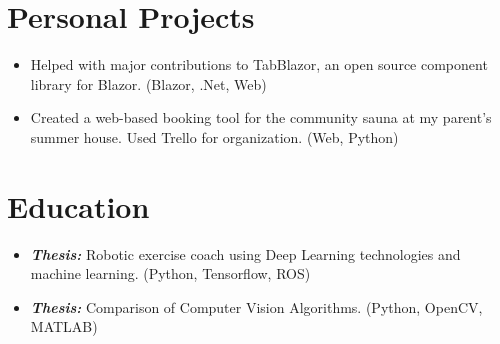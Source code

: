 \documentclass[11pt,a4paper,sans,colorlinks,linkcolor=blue,urlcolor=blue]{moderncv}
\begin{document}
\section{Personal Projects}
{\begin{itemize}
    \itemsep0.3em
    \setlength{\itemindent}{.25in}
    \item Helped with major contributions to TabBlazor, an open source component library for Blazor. (Blazor, .Net, Web)
\end{itemize}}

{\begin{itemize}
    \itemsep0.3em
    \setlength{\itemindent}{.25in}
    \item Created a web-based booking tool for the community sauna at my parent's summer house. Used Trello for organization. (Web, Python)
\end{itemize}}

\section{Education}
{\begin{itemize}
    \setlength{\itemindent}{.25in}
    \itemsep0.3em
    \item \textit{\textbf{Thesis:}} Robotic exercise coach using Deep Learning technologies and machine learning. (Python, Tensorflow, ROS)
\end{itemize}}



{\begin{itemize}
    \setlength{\itemindent}{.25in}
    \itemsep0.3em
    \item \textit{\textbf{Thesis:}} Comparison of Computer Vision Algorithms. (Python, OpenCV, MATLAB)
\end{itemize}}
\end{document}
